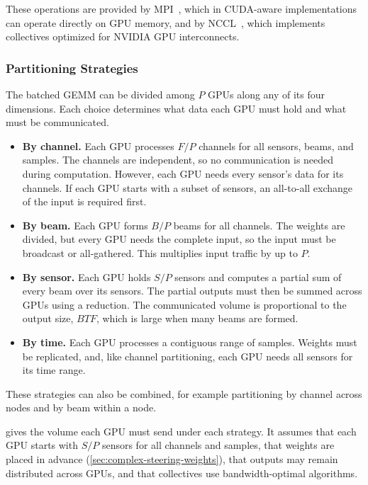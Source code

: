 These operations are provided by MPI~\cite{mpiStandard}, which in CUDA-aware implementations can operate directly on GPU memory, and by NCCL~\cite{ncclDocs}, which implements collectives optimized for NVIDIA GPU interconnects.

\subsubsection{Partitioning Strategies}
\label{sec:partitioning-strategies}

The batched GEMM can be divided among $P$ GPUs along any of its four dimensions. Each choice determines what data each GPU must hold and what must be communicated.

\begin{itemize}
  \item \textbf{By channel.} Each GPU processes $F/P$ channels for all sensors, beams, and samples. The channels are independent, so no communication is needed during computation. However, each GPU needs every sensor's data for its channels. If each GPU starts with a subset of sensors, an all-to-all exchange of the input is required first.
  \item \textbf{By beam.} Each GPU forms $B/P$ beams for all channels. The weights are divided, but every GPU needs the complete input, so the input must be broadcast or all-gathered. This multiplies input traffic by up to $P$.
  \item \textbf{By sensor.} Each GPU holds $S/P$ sensors and computes a partial sum of every beam over its sensors. The partial outputs must then be summed across GPUs using a reduction. The communicated volume is proportional to the output size, $BTF$, which is large when many beams are formed.
  \item \textbf{By time.} Each GPU processes a contiguous range of samples. Weights must be replicated, and, like channel partitioning, each GPU needs all sensors for its time range.
\end{itemize}

These strategies can also be combined, for example partitioning by channel across nodes and by beam within a node.

 gives the volume each GPU must send under each strategy. It assumes that each GPU starts with $S/P$ sensors for all channels and samples, that weights are placed in advance (\cref{sec:complex-steering-weights}), that outputs may remain distributed across GPUs, and that collectives use bandwidth-optimal algorithms.

